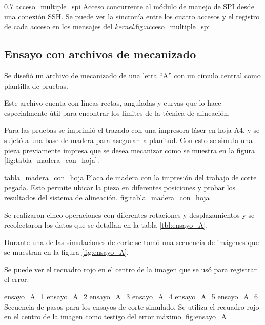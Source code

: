 \subfiga
{0.7} {acceso_multiple_spi} {Acceso concurrente al módulo de manejo de SPI desde una conexión SSH. Se puede ver la sincronía entre los cuatro accesos y el registro de cada acceso en los mensajes del \textit{kernel}.}{fig:acceso_multiple_spi}


\subsection{Ensayo con archivos de mecanizado}

Se diseñó un archivo de mecanizado de una letra ``A'' con un círculo central como plantilla de pruebas.\par
Este archivo cuenta con líneas rectas, anguladas y curvas que lo hace especialmente útil para encontrar los limites de la técnica de alineación. \par
Para las pruebas se imprimió el trazado con una impresora láser en hoja A4, y se sujetó a una base de madera para asegurar la planitud. Con esto se simula una pieza previamente impresa que se desea mecanizar como se muestra en la figura \ref{fig:tabla_madera_con_hoja}.\par

    {tabla_madera_con_hoja} {Placa de madera con la impresión del trabajo de corte pegada. Esto permite ubicar la pieza en diferentes posiciones y probar los resultados del sistema de alineación.} {fig:tabla_madera_con_hoja}

   Se realizaron cinco operaciones con diferentes rotaciones y desplazamientos y se recolectaron los datos que se detallan en la tabla \ref{tbl:ensayo_A}.\par
   Durante una de las simulaciones de corte se tomó una secuencia de imágenes que se muestran en la figura \ref{fig:ensayo_A}.\par
   Se puede ver el recuadro rojo en el centro de la imagen que se usó para registrar el error.\par

   \subfigthreethree
      {ensayo_A_1}
      {ensayo_A_2}
      {ensayo_A_3}
      {ensayo_A_4}
      {ensayo_A_5}
      {ensayo_A_6}
      {Secuencia de pasos para los ensayos de corte simulado. Se utiliza el recuadro rojo en el centro de la imagen como testigo del error máximo.}
      {fig:ensayo_A}

